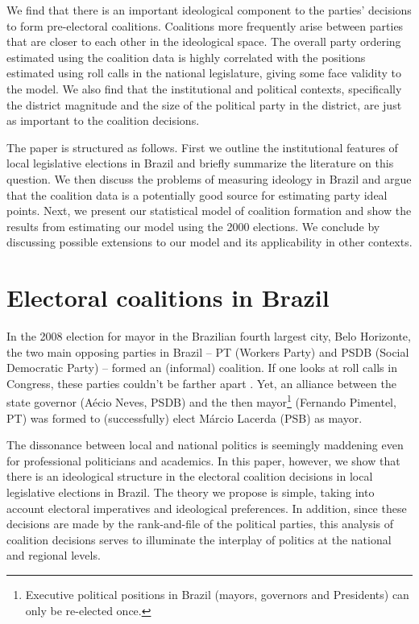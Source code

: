 We find that there is an important ideological component to the parties' decisions to form pre-electoral coalitions. Coalitions more frequently arise between parties that are closer to each other in the ideological space. The overall party ordering estimated using the coalition data is highly correlated with the positions estimated using roll calls in the national legislature, giving some face validity to the model.  We also find that the institutional and political contexts, specifically the district magnitude and the size of the political party in the district, are just as important to the coalition decisions. 

The paper is structured as follows. First we outline the institutional features of local legislative elections in Brazil and briefly summarize the literature on this question. We then discuss the problems  of measuring ideology in Brazil and argue that the coalition data is a potentially good source for estimating party ideal points. Next, we present our statistical model of coalition formation and show the results from estimating our model using the 2000 elections. We  conclude by discussing possible  extensions to our model and its applicability in other contexts.

\section{Electoral coalitions in Brazil}
\label{sec:measuring-ideology}


In the 2008 election for mayor in the Brazilian fourth largest city, Belo Horizonte, the two main opposing parties in Brazil -- PT (Workers Party) and PSDB (Social Democratic Party) -- formed an (informal) coalition.  If one looks at roll calls in Congress, these parties couldn't be farther apart \citep{leoni:2002}. Yet, an alliance between the state governor (Aécio Neves, PSDB) and the then mayor\footnote{Executive political positions in Brazil (mayors, governors and Presidents) can only be re-elected once.} (Fernando Pimentel, PT) was formed to (successfully) elect Márcio Lacerda (PSB) as mayor. 

The dissonance between local and national politics is seemingly maddening even for professional politicians and academics. In this paper, however, we show that there is an ideological structure in the electoral coalition decisions in local legislative elections in Brazil.  The theory we propose is simple, taking into account electoral imperatives and ideological preferences. In addition, since these decisions are made by the rank-and-file of the political parties, this analysis of coalition decisions serves to illuminate the interplay of politics at the national and regional levels. 

